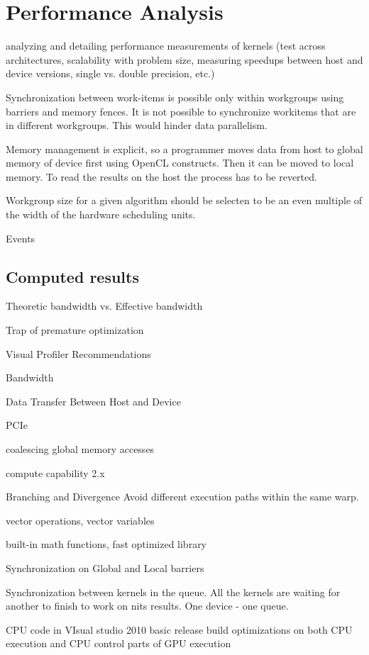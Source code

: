 \chapter{Performance Analysis}

analyzing and detailing performance measurements of kernels (test
across architectures, scalability with problem size, measuring speedups
between host and device versions, single vs. double precision, etc.)


Synchronization between work-items is possible only within workgroups using barriers and memory fences. It is not possible to synchronize workitems that are in different workgroups. This would hinder data parallelism.

Memory management is explicit, so a programmer moves data from host to global memory of device first using OpenCL constructs. Then it can be moved to local memory. To read the results on the host the process has to be reverted.

Workgroup size for a given algorithm should be selecten to be an even multiple of the width of the hardware scheduling units.

Events

\section{Computed results}
Theoretic bandwidth vs. Effective bandwidth

Trap of premature optimization

Visual Profiler Recommendations

Bandwidth

Data Transfer Between Host and Device

PCIe

coalescing global memory accesses

compute capability 2.x

Branching and Divergence
Avoid different execution paths within the same warp.

vector operations, vector variables

built-in math functions, fast optimized library

Synchronization on Global and Local barriers

Synchronization between kernels in the queue. All the kernels are waiting for another to finish to work on nits results.
One device - one queue.

CPU code in VIsual studio 2010 basic release build optimizations on both CPU execution and CPU control parts of GPU execution

